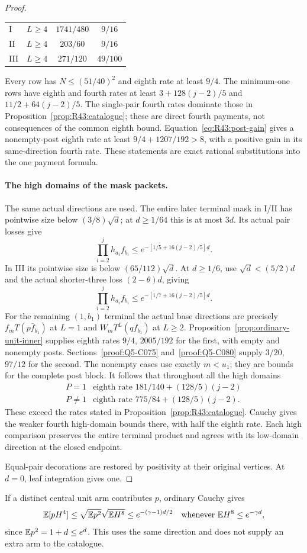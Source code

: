 \begin{proof}
\begin{longtable}{@{}llcc@{}}
I&\(L\ge4\)&\(1741/480\)&\(9/16\)\\
II&\(L\ge4\)&\(203/60\)&\(9/16\)\\
III&\(L\ge4\)&\(271/120\)&\(49/100\)\\
\end{longtable}
Every row has \(N\le(51/40)^2\) and eighth rate at least \(9/4\).
The minimum-one rows have eighth and fourth rates at least
\(3+128(j-2)/5\) and \(11/2+64(j-2)/5\).
The single-pair fourth rates dominate those in
Proposition~\ref{prop:R43:catalogue}; these are direct fourth
payments, not consequences of the common eighth bound.
Equation~\eqref{eq:R43:post-gain} gives a nonempty-post eighth
rate at least \(9/4+1207/192>8\), with a positive gain in its
same-direction fourth rate. These statements are exact rational
substitutions into the one payment formula.

\paragraph{The high domains of the mask packets.}\label{part:R43:high}
The same actual directions are used. The entire later terminal mask
in I/II has pointwise size below \((3/8)\sqrt d\); at
\(d\ge1/64\) this is at most \(3d\). Its actual pair losses give
\[
 \prod_{i=2}^j h_{a_i}f_{b_i}
 \le e^{-[1/5+16(j-2)/5]d}.
\]
In III its pointwise size is below \((65/112)\sqrt d\).
At \(d\ge1/6\), use \(\sqrt d<(5/2)d\) and the actual
shorter-three loss \((2-\theta)d\), giving
\[
 \prod_{i=2}^j h_{a_i}f_{b_i}
 \le e^{-[1/7+16(j-2)/5]d}.
\]
For the remaining \((1,b_1)\) terminal the actual base directions
are precisely \(f_mT(p\bar f_{b_1})\) at \(L=1\) and
\(W_mT^L(qf_{b_1})\) at \(L\ge2\).
Proposition~\ref{prop:ordinary-unit-inner} supplies eighth rates
\(9/4\), \(2005/192\) for the first, with empty and nonempty posts.
Sections~\ref{proof:Q5-C075} and~\ref{proof:Q5-C080} supply
\(3/20\), \(97/12\) for the second. The nonempty cases use exactly
\(m<u_1\); they are bounds for the complete post block.
It follows that throughout all the high domains
\[
 \begin{array}{c|c}
 P=1&\text{eighth rate }181/140+(128/5)(j-2)\\
 P\ne1&\text{eighth rate }775/84+(128/5)(j-2).
 \end{array}
\]
These exceed the rates stated in Proposition~\ref{prop:R43:catalogue}.
Cauchy gives the weaker fourth high-domain bounds there, with half
the eighth rate.  Each high comparison preserves the entire terminal
product and agrees with its low-domain direction at the closed endpoint.

Equal-pair decorations are restored by positivity at their original
vertices. At \(d=0\), leaf integration gives one.
\end{proof}

If a distinct central unit arm contributes \(p\), ordinary Cauchy gives
\[
 \mathbb E[pH^4]\le\sqrt{\mathbb E p^2}\sqrt{\mathbb E H^8}
 \le e^{-(\gamma-1)d/2}\quad\text{whenever }\mathbb E H^8\le e^{-\gamma d},
\]
since \(\mathbb E p^2=1+d\le e^d\). This uses the same direction and
does not supply an extra arm to the catalogue.
